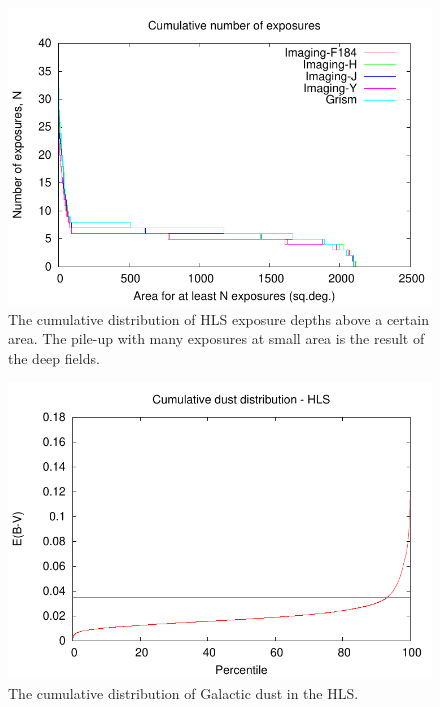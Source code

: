 \begin{figure}
\includegraphics[width=5in]{Plots/hlsdepth.pdf}
\caption{\label{fig:hls_depth}The cumulative distribution of HLS exposure depths above a certain area. The pile-up with many exposures at small area is the result of the deep fields.}
\end{figure}

\begin{figure}
\includegraphics[width=5in]{Plots/hlsdust.pdf}
\caption{\label{fig:hls_dust}The cumulative distribution of Galactic dust in the HLS.}
\end{figure}

